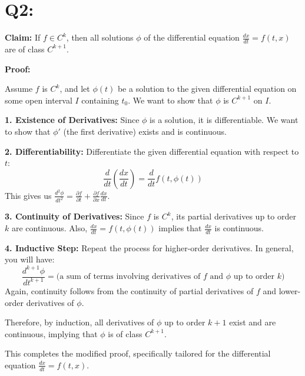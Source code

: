 \documentclass[12pt]{article}
\begin{document}
\section{Q2:}

\textbf{Claim:} If \( f \in C^k \), then all solutions \( \phi \) of the differential equation \( \frac{dx}{dt} = f(t, x) \) are of class \( C^{k+1} \).

\textbf{Proof:}

Assume \( f \) is \( C^k \), and let \( \phi(t) \) be a solution to the given differential equation on some open interval \( I \) containing \( t_0 \). We want to show that \( \phi \) is \( C^{k+1} \) on \( I \).

\textbf{1. Existence of Derivatives:}
Since \( \phi \) is a solution, it is differentiable. We want to show that \( \phi' \) (the first derivative) exists and is continuous.

\textbf{2. Differentiability:}
Differentiate the given differential equation with respect to \( t \):
\[ \frac{d}{dt}\left(\frac{dx}{dt}\right) = \frac{d}{dt}f(t, \phi(t)) \]
This gives us \( \frac{d^2\phi}{dt^2} = \frac{\partial f}{\partial t} + \frac{\partial f}{\partial x}\frac{dx}{dt} \).

\textbf{3. Continuity of Derivatives:}
Since \( f \) is \( C^k \), its partial derivatives up to order \( k \) are continuous. Also, \( \frac{dx}{dt} = f(t, \phi(t)) \) implies that \( \frac{dx}{dt} \) is continuous.

\textbf{4. Inductive Step:}
Repeat the process for higher-order derivatives. In general, you will have:
\[ \frac{d^{k+1}\phi}{dt^{k+1}} = \text{(a sum of terms involving derivatives of } f \text{ and } \phi \text{ up to order } k) \]
Again, continuity follows from the continuity of partial derivatives of \( f \) and lower-order derivatives of \( \phi \).

Therefore, by induction, all derivatives of \( \phi \) up to order \( k+1 \) exist and are continuous, implying that \( \phi \) is of class \( C^{k+1} \).

This completes the modified proof, specifically tailored for the differential equation \( \frac{dx}{dt} = f(t, x) \).
\end{document}
